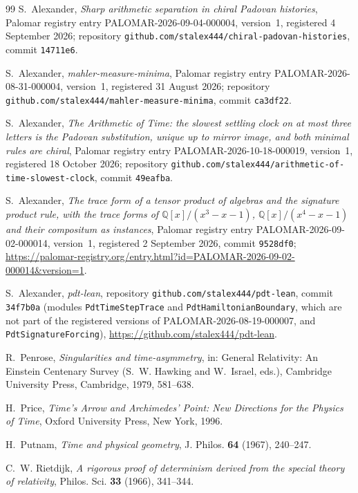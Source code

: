\documentclass[11pt]{amsart}
\theoremstyle{plain}
\theoremstyle{definition}
\theoremstyle{remark}
\begin{document}
\begin{thebibliography}{99}
S.~Alexander,
\emph{Sharp arithmetic separation in chiral Padovan histories},
Palomar registry entry PALOMAR-2026-09-04-000004, version~1, registered 4 September 2026;
repository \texttt{github.com/stalex444/chiral-padovan-histories}, commit
\texttt{14711e6}.

S.~Alexander,
\emph{mahler-measure-minima},
Palomar registry entry PALOMAR-2026-08-31-000004, version~1, registered 31 August 2026;
repository \texttt{github.com/stalex444/mahler-measure-minima}, commit \texttt{ca3df22}.

S.~Alexander,
\emph{The Arithmetic of Time: the slowest settling clock on at most three letters is the
Padovan substitution, unique up to mirror image, and both minimal rules are chiral},
Palomar registry entry PALOMAR-2026-10-18-000019, version~1, registered 18 October 2026;
repository \texttt{github.com/stalex444/arithmetic-of-time-slowest-clock}, commit
\texttt{49eafba}.

S.~Alexander,
\emph{The trace form of a tensor product of algebras and the signature product rule, with
the trace forms of $\mathbb{Q}[x]/(x^3 - x - 1)$, $\mathbb{Q}[x]/(x^4 - x - 1)$ and their
compositum as instances},
Palomar registry entry PALOMAR-2026-09-02-000014, version~1, registered 2 September 2026,
commit \texttt{9528df0};
\url{https://palomar-registry.org/entry.html?id=PALOMAR-2026-09-02-000014&version=1}.

S.~Alexander,
\emph{pdt-lean}, repository \texttt{github.com/stalex444/pdt-lean}, commit \texttt{34f7b0a}
(modules \texttt{PdtTimeStepTrace} and \texttt{PdtHamiltonianBoundary}, which are not part of
the registered versions of PALOMAR-2026-08-19-000007, and \texttt{PdtSignatureForcing}),
\url{https://github.com/stalex444/pdt-lean}.

R.~Penrose,
\emph{Singularities and time-asymmetry},
in: General Relativity: An Einstein Centenary Survey (S.~W. Hawking and W.~Israel, eds.),
Cambridge University Press, Cambridge, 1979, 581--638.

H.~Price,
\emph{Time's Arrow and Archimedes' Point: New Directions for the Physics of Time},
Oxford University Press, New York, 1996.

H.~Putnam,
\emph{Time and physical geometry},
J. Philos. \textbf{64} (1967), 240--247.

C.~W. Rietdijk,
\emph{A rigorous proof of determinism derived from the special theory of relativity},
Philos. Sci. \textbf{33} (1966), 341--344.


\end{thebibliography}
\end{document}
